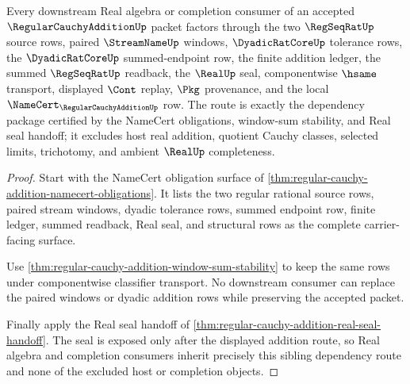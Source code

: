 \begin{theorem}
\label{thm:regular-cauchy-addition-sibling-dependency-route}
Every downstream Real algebra or completion consumer of an accepted $\RegularCauchyAdditionUp$ packet factors through the two $\RegSeqRatUp$ source rows, paired $\StreamNameUp$ windows, $\DyadicRatCoreUp$ tolerance rows, the $\DyadicRatCoreUp$ summed-endpoint row, the finite addition ledger, the summed $\RegSeqRatUp$ readback, the $\RealUp$ seal, componentwise $\hsame$ transport, displayed $\Cont$ replay, $\Pkg$ provenance, and the local $\NameCert_{\RegularCauchyAdditionUp}$ row. The route is exactly the dependency package certified by the NameCert obligations, window-sum stability, and Real seal handoff; it excludes host real addition, quotient Cauchy classes, selected limits, trichotomy, and ambient $\RealUp$ completeness.
\end{theorem}
\begin{proof}
Start with the NameCert obligation surface of \autoref{thm:regular-cauchy-addition-namecert-obligations}. It lists the two regular rational source rows, paired stream windows, dyadic tolerance rows, summed endpoint row, finite ledger, summed readback, Real seal, and structural rows as the complete carrier-facing surface.

Use \autoref{thm:regular-cauchy-addition-window-sum-stability} to keep the same rows under componentwise classifier transport. No downstream consumer can replace the paired windows or dyadic addition rows while preserving the accepted packet.

Finally apply the Real seal handoff of \autoref{thm:regular-cauchy-addition-real-seal-handoff}. The seal is exposed only after the displayed addition route, so Real algebra and completion consumers inherit precisely this sibling dependency route and none of the excluded host or completion objects.
\end{proof}

